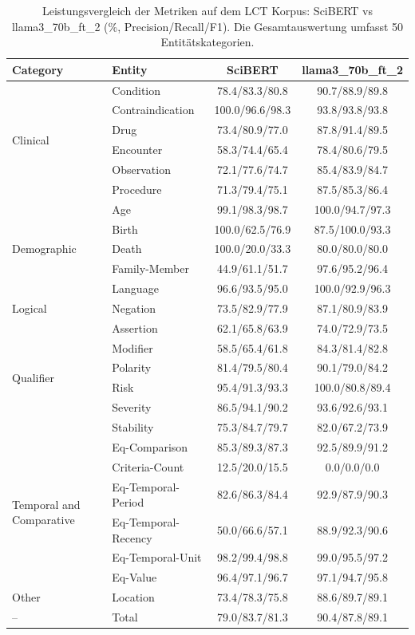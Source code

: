 
\begin{table}[htbp]
\centering
\begin{tabular}{llcc}
\toprule
\textbf{Category} & \textbf{Entity} & \textbf{SciBERT} & \textbf{llama3_70b_ft_2} \\
\midrule
\multirow{6}{*}{Clinical} & Condition & 78.4/83.3/80.8 & 90.7/88.9/89.8 \\
 & Contraindication & 100.0/96.6/98.3 & 93.8/93.8/93.8 \\
 & Drug & 73.4/80.9/77.0 & 87.8/91.4/89.5 \\
 & Encounter & 58.3/74.4/65.4 & 78.4/80.6/79.5 \\
 & Observation & 72.1/77.6/74.7 & 85.4/83.9/84.7 \\
 & Procedure & 71.3/79.4/75.1 & 87.5/85.3/86.4 \\
\midrule
\multirow{5}{*}{Demographic} & Age & 99.1/98.3/98.7 & 100.0/94.7/97.3 \\
 & Birth & 100.0/62.5/76.9 & 87.5/100.0/93.3 \\
 & Death & 100.0/20.0/33.3 & 80.0/80.0/80.0 \\
 & Family-Member & 44.9/61.1/51.7 & 97.6/95.2/96.4 \\
 & Language & 96.6/93.5/95.0 & 100.0/92.9/96.3 \\
\midrule
Logical & Negation & 73.5/82.9/77.9 & 87.1/80.9/83.9 \\
\midrule
\multirow{6}{*}{Qualifier} & Assertion & 62.1/65.8/63.9 & 74.0/72.9/73.5 \\
 & Modifier & 58.5/65.4/61.8 & 84.3/81.4/82.8 \\
 & Polarity & 81.4/79.5/80.4 & 90.1/79.0/84.2 \\
 & Risk & 95.4/91.3/93.3 & 100.0/80.8/89.4 \\
 & Severity & 86.5/94.1/90.2 & 93.6/92.6/93.1 \\
 & Stability & 75.3/84.7/79.7 & 82.0/67.2/73.9 \\
\midrule
\multirow{6}{*}{Temporal and Comparative} & Eq-Comparison & 85.3/89.3/87.3 & 92.5/89.9/91.2 \\
 & Criteria-Count & 12.5/20.0/15.5 & 0.0/0.0/0.0 \\
 & Eq-Temporal-Period & 82.6/86.3/84.4 & 92.9/87.9/90.3 \\
 & Eq-Temporal-Recency & 50.0/66.6/57.1 & 88.9/92.3/90.6 \\
 & Eq-Temporal-Unit & 98.2/99.4/98.8 & 99.0/95.5/97.2 \\
 & Eq-Value & 96.4/97.1/96.7 & 97.1/94.7/95.8 \\
\midrule
Other & Location & 73.4/78.3/75.8 & 88.6/89.7/89.1 \\
\midrule
-- & Total & 79.0/83.7/81.3 & 90.4/87.8/89.1 \\
\bottomrule
\end{tabular}
\caption{Leistungsvergleich der Metriken auf dem LCT Korpus: SciBERT vs llama3_70b_ft_2 (\%, Precision/Recall/F1). Die Gesamtauswertung umfasst 50 Entitätskategorien.}
\label{tab:metrics_comparison}
\end{table}
    